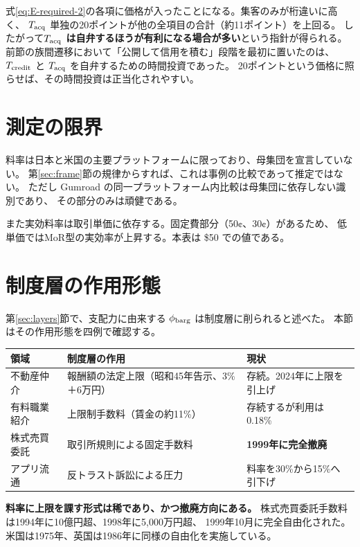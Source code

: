 式\eqref{eq:E-required-2}の各項に価格が入ったことになる。集客のみが桁違いに高く、
$T_{\rm acq}$ 単独の20ポイントが他の全項目の合計（約11ポイント）を上回る。
したがって\textbf{$T_{\rm acq}$ は自弁するほうが有利になる場合が多い}という指針が得られる。
前節の族間遷移において「公開して信用を積む」段階を最初に置いたのは、
$T_{\rm credit}$ と $T_{\rm acq}$ を自弁するための時間投資であった。
20ポイントという価格に照らせば、その時間投資は正当化されやすい。

\section{測定の限界}

料率は日本と米国の主要プラットフォームに限っており、母集団を宣言していない。
第\ref{sec:frame}節の規律からすれば、これは事例の比較であって推定ではない。
ただし Gumroad の同一プラットフォーム内比較は母集団に依存しない識別であり、
その部分のみは頑健である。

また実効料率は取引単価に依存する。固定費部分（50¢、30¢）があるため、
低単価ではMoR型の実効率が上昇する。本表は \$50 での値である。

\section{制度層の作用形態}
\label{sec:institution-mode}

第\ref{sec:layers}節で、支配力に由来する $\phi_{\rm barg}$ は制度層に削られると述べた。
本節はその作用形態を四例で確認する。

\begin{center}
\begin{tabularx}{\textwidth}{@{}lXl@{}}
\toprule
領域 & 制度層の作用 & 現状 \\
\midrule
不動産仲介 & 報酬額の法定上限（昭和45年告示、3\%＋6万円） & 存続。2024年に上限を引上げ \\
有料職業紹介 & 上限制手数料（賃金の約11\%） & 存続するが利用は 0.18\% \\
株式売買委託 & 取引所規則による固定手数料 & \textbf{1999年に完全撤廃} \\
アプリ流通 & 反トラスト訴訟による圧力 & 料率を30\%から15\%へ引下げ \\
\bottomrule
\end{tabularx}
\label{tab:fee-institution-modes}
\end{center}

\textbf{料率に上限を課す形式は稀であり、かつ撤廃方向にある。}
株式売買委託手数料は1994年に10億円超、1998年に5{,}000万円超、
1999年10月に完全自由化された。
米国は1975年、英国は1986年に同様の自由化を実施している。

